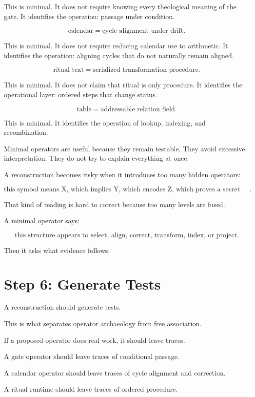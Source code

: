 \documentclass[11pt]{book}
\begin{document}
This is minimal. It does not require knowing every theological meaning of the gate. It identifies the operation: passage under condition.

\[
\text{calendar} = \text{cycle alignment under drift}.
\]

This is minimal. It does not require reducing calendar use to arithmetic. It identifies the operation: aligning cycles that do not naturally remain aligned.

\[
\text{ritual text} = \text{serialized transformation procedure}.
\]

This is minimal. It does not claim that ritual is only procedure. It identifies the operational layer: ordered steps that change status.

\[
\text{table} = \text{addressable relation field}.
\]

This is minimal. It identifies the operation of lookup, indexing, and recombination.

Minimal operators are useful because they remain testable. They avoid excessive interpretation. They do not try to explain everything at once.

A reconstruction becomes risky when it introduces too many hidden operators:

\[
\text{this symbol means X, which implies Y, which encodes Z, which proves a secret doctrine}.
\]

That kind of reading is hard to correct because too many levels are fused.

A minimal operator says:

\[
\text{this structure appears to select, align, correct, transform, index, or project}.
\]

Then it asks what evidence follows.

\section{Step 6: Generate Tests}

A reconstruction should generate tests.

This is what separates operator archaeology from free association.

If a proposed operator does real work, it should leave traces.

A gate operator should leave traces of conditional passage.

A calendar operator should leave traces of cycle alignment and correction.

A ritual runtime should leave traces of ordered procedure.
\end{document}
